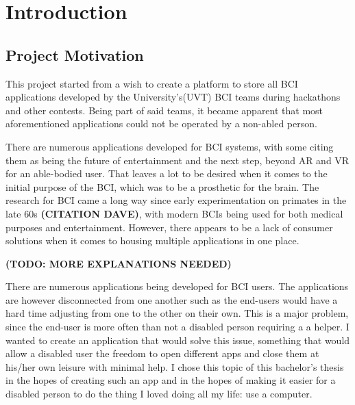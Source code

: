 
\chapter{Introduction}\label{cap:intro}



\section{Project Motivation}\label{sect:motivation}
\hspace{\parindent} This project started from a wish to create a platform to store all BCI applications developed by the University's(UVT) BCI teams during hackathons and other contests. Being part of said teams, it became apparent that most aforementioned applications could not be operated by a non-abled person.

\vspace*{2mm}
\hspace{\parindent} There are numerous applications developed for BCI systems, with some citing them as being the future of entertainment and the next step, beyond AR and VR for an able-bodied user\cite{future_of_metaverse_BCI}. That leaves a lot to be desired when it comes to the initial purpose of the BCI, which was to be a prosthetic for the brain. The research for BCI came a long way since early experimentation on primates in the late 60s {\bfseries(CITATION DAVE)}, with modern BCIs being used for both medical purposes and entertainment. However, there appears to be a lack of consumer solutions when it comes to housing multiple applications in one place.

{\bfseries(TODO: MORE EXPLANATIONS NEEDED)}

\vspace*{2mm}
\hspace{\parindent} There are numerous applications being developed for BCI users. The applications are however disconnected from one another such as the end-users would have a hard time adjusting from one to the other on their own. This is a major problem, since the end-user is more often than not a disabled person requiring a a helper. I wanted to create an application that would solve this issue, something that would allow a disabled user the freedom to open different apps and close them at his/her own leisure with minimal help. I chose this topic of this bachelor's thesis in the hopes of creating such an app and in the hopes of making it easier for a disabled person to do the thing I loved doing all my life: use a computer.



